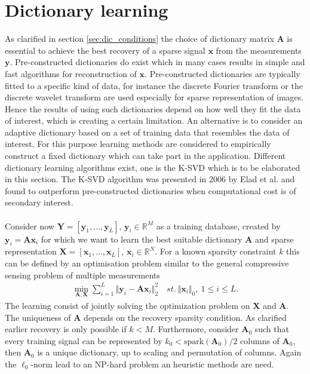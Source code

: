\section{Dictionary learning}\label{sec:dictionarylearning}
As clarified in section \ref{sec:dic_conditions} the choice of dictionary matrix $\textbf{A}$ is essential to achieve the best recovery of a sparse signal $\textbf{x}$ from the measurements $\textbf{y}$. Pre-constructed dictionaries do exist which in many cases results in simple and fast algorithms for reconstruction of $\textbf{x}$\cite{Elad_book}. Pre-constructed dictionaries are typically fitted to a specific kind of data, for instance the discrete Fourier transform or the discrete wavelet transform are used especially for sparse representation of images\cite{Elad_book}. Hence the results of using such dictionaries depend on how well they fit the data of interest, which is creating a certain limitation. An alternative is to consider an adaptive dictionary based on a set of training data that resembles the data of interest. For this purpose learning methods are considered to empirically construct a fixed dictionary which can take part in the application. Different dictionary learning algorithms exist, one is the K-SVD which is to be elaborated in this section. The K-SVD algorithm was presented in 2006 by Elad et al. and found to outperform pre-constructed dictionaries when computational cost is of secondary interest\cite{Elad2006}. \\
\\
Consider now $\textbf{Y}=\left[ \textbf{y}_1, \dots ,\textbf{y}_L \right]$, $\textbf{y}_i\in \mathbb{R}^{M}$ as a training database, created by $\textbf{y}_i=\textbf{A}\textbf{x}_i$ for which we want to learn the best suitable dictionary $\textbf{A}$ and sparse representation $\textbf{X}=\left[ \textbf{x}_1, \dots ,\textbf{x}_L \right]$, $\textbf{x}_i\in \mathbb{R}^{N}$. For a known sparsity constraint $k$ this can be defined by an optimisation problem similar to the general compressive sensing problem of multiple measurements \cite{Elad_book}
\begin{align}
\min_{\mathbf{A,X}} \sum_{i=1}^{L} \Vert \mathbf{y} _i - \mathbf{Ax}_i \Vert_2^2 \quad st. \ \Vert \textbf{x}_i\Vert_0, \ 1\leq i \leq L.\label{eq:SVD1}
\end{align}  
The learning consist of jointly solving the optimization problem on $\textbf{X}$ and $\textbf{A}$. The uniqueness of $\textbf{A}$ depends on the recovery sparsity condition. As clarified earlier recovery is only possible if $k < M$\cite{phd2015}. Furthermore, consider $\textbf{A}_0$ such that every training signal can be represented by $k_0 < \text{spark}(\textbf{A}_0)/2$ columns of $\textbf{A}_0$, then $\textbf{A}_0$ is a unique dictionary, up to scaling and permutation of columns\cite{Elad_book}. Again the $\ell_0$-norm lead to an NP-hard problem an heuristic methods are need.     

